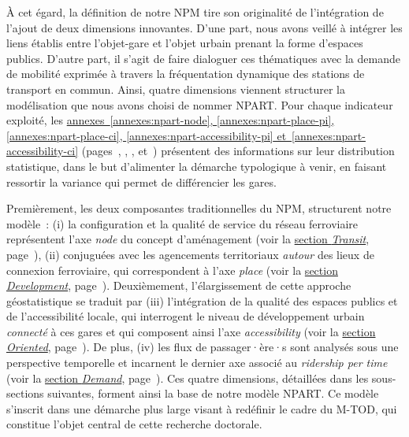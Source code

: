 \begin{refsegment}
À cet égard, la définition de notre \acrshort{NPM} tire son originalité de l’intégration de l'ajout de deux dimensions innovantes. D'une part, nous avons veillé à intégrer les liens établis entre l’objet-gare et l’objet urbain prenant la forme d'espaces publics. D'autre part, il s'agit de faire dialoguer ces thématiques avec la demande de mobilité exprimée à travers la fréquentation dynamique des stations de transport en commun. Ainsi, quatre dimensions viennent structurer la modélisation que nous avons choisi de nommer \acrfull{NPART}. Pour chaque indicateur exploité, les \hyperref[annexes:npart-node]{annexes~\ref{annexes:npart-node}, \ref{annexes:npart-place-pi}, \ref{annexes:npart-place-ci}, \ref{annexes:npart-accessibility-pi} et~\ref{annexes:npart-accessibility-ci}} (pages~\pageref{annexes:npart-node}, \pageref{annexes:npart-place-pi}, \pageref{annexes:npart-place-ci}, \pageref{annexes:npart-accessibility-pi} et~\pageref{annexes:npart-accessibility-ci}) présentent des informations sur leur distribution statistique, dans le but d'alimenter la démarche typologique à venir, en faisant ressortir la variance qui permet de différencier les gares.%

Premièrement, les deux composantes traditionnelles du \acrshort{NPM}, structurent notre modèle~: (i) la configuration et la qualité de service du réseau ferroviaire représentent l'axe \textsl{node} du concept d’aménagement (voir la \hyperref[chap6:methodologie-indicateurs-node]{section \textsl{Transit}}, page~\pageref{chap6:methodologie-indicateurs-node}), (ii) conjuguées avec les agencements territoriaux \textsl{autour} des lieux de connexion ferroviaire, qui correspondent à l'axe \textsl{place} (voir la \hyperref[chap6:methodologie-indicateurs-place]{section \textsl{Development}}, page~\pageref{chap6:methodologie-indicateurs-place}). Deuxièmement, l’élargissement de cette approche géostatistique se traduit par (iii) l'intégration de la qualité des espaces publics et de l’accessibilité locale, qui interrogent le niveau de développement urbain \textsl{connecté} à ces gares et qui composent ainsi l'axe \textsl{accessibility} (voir la \hyperref[chap6:methodologie-indicateurs-accessibility]{section \textsl{Oriented}}, page~\pageref{chap6:methodologie-indicateurs-accessibility}). De plus, (iv) les flux de passager·ère·s sont analysés sous une perspective temporelle et incarnent le dernier axe associé au \textsl{ridership per time} (voir la \hyperref[chap6:methodologie-indicateurs-frequentation]{section \textsl{Demand}}, page~\pageref{chap6:methodologie-indicateurs-frequentation}). Ces quatre dimensions, détaillées dans les sous-sections suivantes, forment ainsi la base de notre modèle \acrshort{NPART}. Ce modèle s’inscrit dans une démarche plus large visant à redéfinir le cadre du \acrshort{M-TOD}, qui constitue l’objet central de cette recherche doctorale.%


\end{refsegment}
